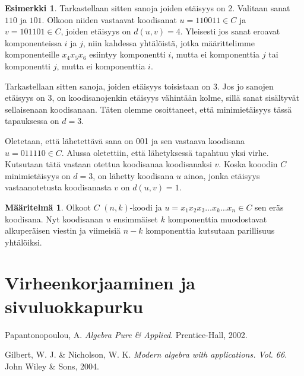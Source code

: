 \documentclass[a4paper,12pt,leqno,oneside]{report} %
\theoremstyle{plain}
\theoremstyle{definition}
\newtheorem{maaritelma}{Määritelmä}[chapter]
\newtheorem{esimerkki}{Esimerkki}[chapter]
\theoremstyle{remark}
\numberwithin{equation}{chapter}
\begin{document}
\begin{esimerkki}
        Tarkastellaan sitten sanoja joiden etäisyys on 2. Valitaan sanat $110$ ja $101$. Olkoon niiden vastaavat koodisanat $u = 110011 \in C$ ja $v = 101101 \in C$, joiden etäisyys on $d(u, v) = 4$. Yleisesti jos sanat eroavat komponenteissa $i$ ja $j$, niin kahdessa yhtälöistä, jotka määrittelimme komponenteille $x_4x_5x_6$ esiintyy komponentti $i$, mutta ei komponenttia $j$ tai komponentti $j$, mutta ei komponenttia $i$. 
        
        Tarkastellaan sitten sanoja, joiden etäisyys toisistaan on 3. Jos jo sanojen etäisyys on 3, on koodisanojenkin etäisyys vähintään kolme, sillä sanat sisältyvät sellaisenaan koodisanaan. Täten olemme osoittaneet, että minimietäisyys tässä tapauksessa on $d = 3$.

        Oletetaan, että lähetettävä sana on 001 ja sen vastaava koodisana $u = 011110 \in C$. 
        Alussa oletettiin, että lähetyksessä tapahtuu yksi virhe. Kutsutaan tätä vastaan otettua koodisanaa koodisanaksi $v$. Koska kooodin $C$ minimietäisyys on $d = 3$, on lähetty koodisana $u$ ainoa, jonka etäisyys vastaanotetusta koodisanasta $v$ on $d(u,v) = 1$.
    \end{esimerkki}

    \begin{maaritelma}\label{maar:nkkoodi}
        Olkoot $C$ $(n, k)$-koodi ja $u = x_1x_2x_3\dots x_k \dots x_n \in C$ sen eräs koodisana. Nyt koodisanan $u$ ensimmäiset $k$ komponenttia muodostavat alkuperäisen viestin ja viimeisiä $n-k$ komponenttia kutsutaan parillisuus yhtälöiksi.
    \end{maaritelma}

    \chapter{Virheenkorjaaminen ja sivuluokkapurku}

    \begin{thebibliography}{9}


        Papantonopoulou, A.
        \emph{Algebra Pure \& Applied}.
        Prentice-Hall, 2002.

        Gilbert, W. J. \& Nicholson, W. K.
        \emph{Modern algebra with applications. Vol. 66}.
        John Wiley \& Sons, 2004.

\end{thebibliography}
\end{document}
